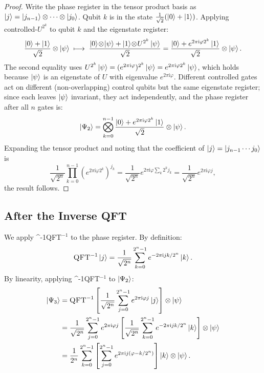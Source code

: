 \documentclass[12pt,a4paper]{article}
\newcommand{\IQFT}{\ifmmode \text{\textsc{QFT}}^{-1}\else \textsc{QFT}$^{-1}$\fi}
\newcommand{\ii}{\mathrm{i}}
\begin{document}
\begin{proof}
  Write the phase register in the tensor product basis as
  $\Ket{j} = \Ket{j_{n-1}}\otimes\cdots\otimes\Ket{j_0}$.
  Qubit $k$ is in the state $\tfrac{1}{\sqrt{2}}(\Ket{0}+\Ket{1})$.
  Applying controlled-$U^{2^k}$ to qubit $k$ and the eigenstate register:
  \[
    \frac{\Ket{0}+\Ket{1}}{\sqrt{2}}\otimes\Ket{\psi}
    \;\longmapsto\;
    \frac{\Ket{0}\!\otimes\!\Ket{\psi}+\Ket{1}\!\otimes\! U^{2^k}\Ket{\psi}}{\sqrt{2}}
    = \frac{\Ket{0}+e^{2\pi \ii \varphi 2^k}\Ket{1}}{\sqrt{2}}\otimes\Ket{\psi}.
  \]
  The second equality uses $U^{2^k}\Ket{\psi} = (e^{2\pi\ii\varphi})^{2^k}\Ket{\psi}
  = e^{2\pi\ii\varphi 2^k}\Ket{\psi}$, which holds because $\Ket{\psi}$ is an
  eigenstate of $U$ with eigenvalue $e^{2\pi\ii\varphi}$.
  Different controlled gates act on different (non-overlapping) control qubits
  but the same eigenstate register; since each leaves $\Ket{\psi}$ invariant,
  they act independently, and the phase register after all $n$ gates is:
  \[
    \Ket{\Psi_2}
    = \bigotimes_{k=0}^{n-1}
        \frac{\Ket{0}+e^{2\pi \ii \varphi 2^k}\Ket{1}}{\sqrt{2}}
      \otimes\Ket{\psi}.
  \]
  Expanding the tensor product and noting that the coefficient of
  $\Ket{j} = \Ket{j_{n-1}\cdots j_0}$ is
  \[
    \frac{1}{\sqrt{2^n}}
    \prod_{k=0}^{n-1} \left(e^{2\pi \ii \varphi 2^k}\right)^{j_k}
    = \frac{1}{\sqrt{2^n}} e^{2\pi \ii \varphi \sum_k 2^k j_k}
    = \frac{1}{\sqrt{2^n}} e^{2\pi \ii \varphi j},
  \]
  the result follows. \qedhere
\end{proof}

\subsection{After the Inverse QFT}

We apply \IQFT{} to the phase register.  By definition:
\[
  \IQFT\Ket{j} = \frac{1}{\sqrt{2^n}}\sum_{k=0}^{2^n-1} e^{-2\pi \ii jk/2^n}\Ket{k}.
\]
By linearity, applying \IQFT{} to $\Ket{\Psi_2}$:
\begin{align}
  \Ket{\Psi_3}
  &= \IQFT\left[\frac{1}{\sqrt{2^n}}\sum_{j=0}^{2^n-1} e^{2\pi \ii \varphi j}\Ket{j}\right]
     \otimes\Ket{\psi} \notag \\
  &= \frac{1}{\sqrt{2^n}}\sum_{j=0}^{2^n-1} e^{2\pi \ii \varphi j}
       \left[\frac{1}{\sqrt{2^n}}\sum_{k=0}^{2^n-1} e^{-2\pi \ii jk/2^n}\Ket{k}\right]
     \otimes\Ket{\psi} \notag \\
  &= \frac{1}{2^n}\sum_{k=0}^{2^n-1}\left[
       \sum_{j=0}^{2^n-1} e^{2\pi \ii j(\varphi - k/2^n)}
     \right]\Ket{k}\otimes\Ket{\psi}.
  \label{eq:after_iqft}
\end{align}
\end{document}
